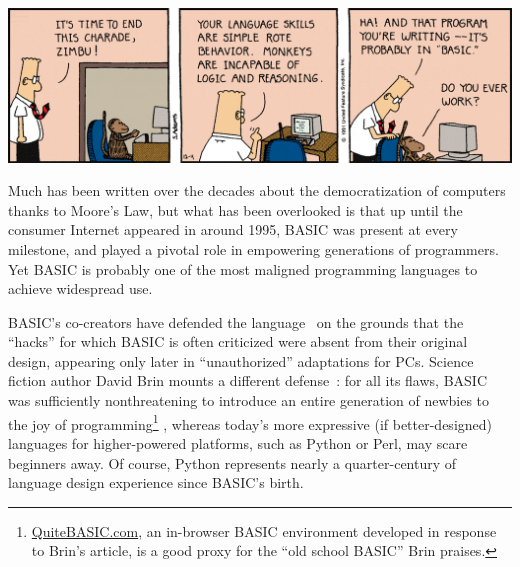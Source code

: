 

\includegraphics[width=\textwidth]{figs/dilbert-1991-12-04.png}



Much has been written over the decades about the democratization of
computers thanks to Moore's Law, but what has been overlooked is that up
until the consumer Internet appeared in around 1995, BASIC was present
at every milestone, and played a pivotal role in empowering generations
of programmers.
Yet BASIC is probably one of the most maligned programming languages
to achieve widespread use.

BASIC's co-creators have defended the language~\cite{backtobasic} on the
grounds that the 
``hacks'' for which BASIC is often criticized were absent from 
 their original design, appearing only later in ``unauthorized''
 adaptations for PCs.
Science fiction author David Brin mounts a different
defense~\cite{why_johnny_cant_code}: 
for all its flaws, BASIC
was sufficiently nonthreatening to introduce an entire generation of
newbies to the joy of programming\footnote{\href{http://quitebasic.com}{QuiteBASIC.com}, an
in-browser BASIC environment developed in response to Brin's article, is
a good proxy for the ``old school BASIC'' Brin praises.}%
, whereas today's more expressive
(if better-designed) languages for higher-powered 
platforms, such as Python or Perl, may scare beginners away.
Of course, Python represents 
nearly a quarter-century of language design experience since BASIC's birth.

